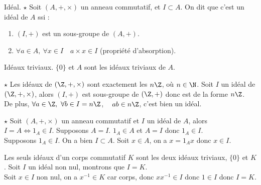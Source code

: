 \documentclass[11pt]{article}
\begin{document}
\vspace*{-0.8cm}

\begin{defi}{Idéal. $\star$}{}
    Soit $(A,+,\times)$ un anneau commutatif, et $I\subset A$. On dit que c'est un idéal de $A$ ssi :
    \begin{enumerate}
        \item $(I,+)$ est un sous-groupe de $(A,+)$.
        \item $\forall a \in A, ~ \forall x \in I \quad a\times x \in I$ (propriété d'absorption).
    \end{enumerate}
\end{defi}

\begin{ex}{Idéaux triviaux.}{}
    $\{0\}$ et $A$ sont les idéaux triviaux de $A$.
\end{ex}

\vspace*{-0.7cm}

\begin{prop}{$\star$}{}
    Les idéaux de $(\Z,+,\times)$ sont exactement les $n\Z$, où $n\in\N$.
    \tcblower
    Soit $I$ un idéal de $(\Z,+,\times)$, alors $(I,+)$ est sous-groupe de $(\Z,+)$ donc est de la forme $n\Z$.\\
    De plus, $\forall a \in \Z, ~ \forall b \in I = n\Z$, ~ $ab\in n\Z$, c'est bien un idéal. 
\end{prop}

\vspace*{-0.7cm}

\begin{prop}{$\star$}{}
    Soit $(A,+,\times)$ un anneau commutatif et $I$ un idéal de $A$, alors $I=A \iff 1_A\in I$.
    \tcblower
    \boxed{\ra} Supposons $A=I$. $1_A\in A$ et $A=I$ donc $1_A\in I$.\\
    \boxed{\la} Supposons $1_A\in I$. On a bien $I\subset A$. Soit $x\in A$, on a $x=1_A x$ donc $x\in I$. 
\end{prop}

\vspace*{-0.7cm}

\begin{ex}{}{}
    Les seuls idéaux d'un corps commutatif $K$ sont les deux idéaux triviaux, $\{0\}$ et $K$.
    \tcblower
    Soit $I$ un idéal non nul, montrons que $I=K$.\\
    Soit $x\in I$ non nul, on a $x^{-1}\in K$ car corps, donc $xx^{-1}\in I$ donc $1\in I$ donc $I=K$.
\end{ex}
\end{document}
